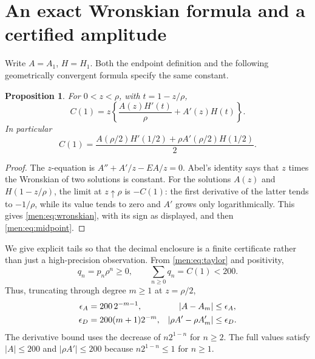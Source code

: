 \documentclass[11pt,letterpaper]{article}
\newtheorem{proposition}[theorem]{Proposition}
\theoremstyle{remark}\newtheorem{remark}[theorem]{Remark}
\begin{document}
\section{An exact Wronskian formula and a certified amplitude}\label{men:sec:certificate}
Write $A=A_1$, $H=H_1$. Both the endpoint definition and the following geometrically convergent formula specify the same constant.

\begin{proposition}\label{men:prop:wronskian}
For $0<z<\rho$, with $t=1-z/\rho$,
\begin{equation}\label{men:eq:wronskian}
 C(1)=z\left\{\frac{A(z)H'(t)}\rho+A'(z)H(t)\right\}.
\end{equation}
In particular
\begin{equation}\label{men:eq:midpoint}
 C(1)=\frac{A(\rho/2)H'(1/2)+\rho A'(\rho/2)H(1/2)}2.
\end{equation}
\end{proposition}
\begin{proof}
The $z$-equation is $A''+A'/z-EA/z=0$. Abel's identity says that $z$ times the Wronskian of two solutions is constant. For the solutions $A(z)$ and $H(1-z/\rho)$, the limit at $z\uparrow\rho$ is $-C(1)$: the first derivative of the latter tends to $-1/\rho$, while its value tends to zero and $A'$ grows only logarithmically. This gives \eqref{men:eq:wronskian}, with its sign as displayed, and then \eqref{men:eq:midpoint}.
\end{proof}

We give explicit tails so that the decimal enclosure is a finite certificate rather than just a high-precision observation. From \eqref{men:eq:taylor} and positivity,
\[
 q_n=p_n\rho^n\ge0,\qquad \sum_{n\ge0}q_n=C(1)<200.
\]
Thus, truncating through degree $m\ge1$ at $z=\rho/2$,
\begin{align}
 \epsilon_A&=200\,2^{-m-1},&
 |A-A_m|&\le\epsilon_A,\notag\\
 \epsilon_D&=200(m+1)2^{-m},&
 |\rho A'-\rho A_m'|&\le\epsilon_D.\label{men:eq:Atails}
\end{align}
The derivative bound uses the decrease of $n2^{1-n}$ for $n\ge2$. The full values satisfy $|A|\le200$ and $|\rho A'|\le200$ because $n2^{1-n}\le1$ for $n\ge1$.
\end{document}

